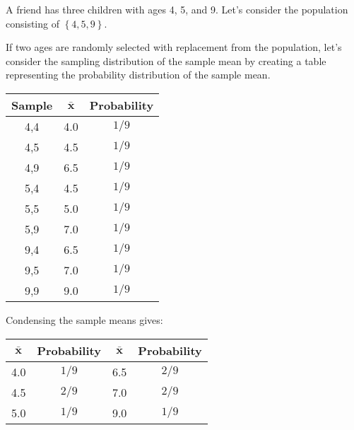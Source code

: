 \documentclass{beamer}
\begin{document}
\begin{frame}
\begin{example}
A friend has three children with ages 4, 5, and 9. Let's consider the population consisting of $\left\{4,5,9\right\}$.

\vspace{2mm}
If two ages are randomly selected with replacement from the population, let's consider the sampling distribution of the sample mean by creating a table representing the probability distribution of the sample mean.

\vspace{2mm}
\begin{overprint}
\begin{center}
\begin{tabular}{|c|c|c|}\hline
\textbf{Sample} & $\boldsymbol{\bar{x}}$ & \textbf{Probability} \\\hline
4,4 & 4.0 & $1/9$ \\\hline
4,5 & 4.5 & $1/9$ \\\hline
4,9 & 6.5 & $1/9$ \\\hline
5,4 & 4.5 & $1/9$ \\\hline
5,5 & 5.0 & $1/9$ \\\hline
5,9 & 7.0 & $1/9$ \\\hline
9,4 & 6.5 & $1/9$ \\\hline
9,5 & 7.0 & $1/9$ \\\hline
9,9 & 9.0 & $1/9$ \\\hline
\end{tabular}
\end{center}
Condensing the sample means gives:
\begin{center}
\begin{tabular}{|c|c||c|c|}\hline
$\boldsymbol{\bar{x}}$ & \textbf{Probability} & $\boldsymbol{\bar{x}}$ & \textbf{Probability} \\\hline
4.0 & $1/9$ & 6.5 & $2/9$ \\\hline
4.5 & $2/9$ & 7.0 & $2/9$ \\\hline
5.0 & $1/9$ & 9.0 & $1/9$ \\\hline
\end{tabular}
\end{center}


\vspace{2mm}
\end{overprint}
\vspace{-23mm}
\end{example}
\end{frame}
\end{document}
